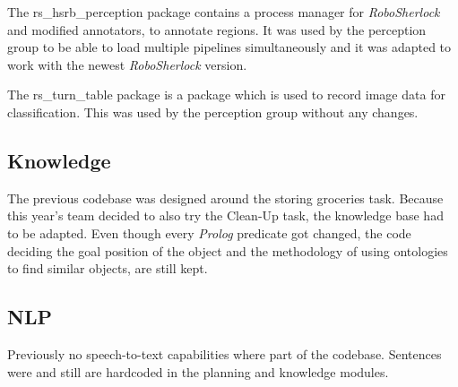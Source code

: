 \documentclass[main.tex]{subfiles}
\begin{document}
	 The rs\_hsrb\_perception package contains a process manager for \textit{RoboSherlock} and modified annotators, to annotate regions. It was used by the perception group to be able to load multiple pipelines simultaneously and it was adapted to work with the newest \textit{RoboSherlock} version.
	 
	 The rs\_turn\_table package is a package which is used to record image data for classification. This was used by the perception group without any changes. 
	\subsection{Knowledge}
        The previous codebase was designed around the storing groceries task. Because this year's team decided to also try the Clean-Up task, the knowledge base had to be adapted. Even though every \textit{Prolog} predicate got changed, the code deciding the goal position of the object and the methodology of using ontologies to find similar objects, are still kept.
    \subsection{NLP}
        Previously no speech-to-text capabilities where part of the codebase. Sentences were and still are hardcoded in the planning and knowledge modules.
\end{document}
